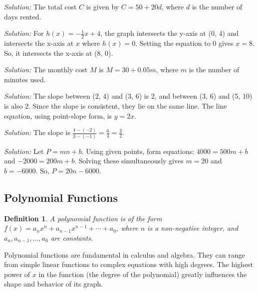 \documentclass[a4paper,12pt]{book}
\newenvironment{solution}[1][]
{\par\noindent\textit{Solution:} \rmfamily}{\medskip}
\newtheorem{definition}{Definition}
\begin{document}
\begin{solution}[5]
The total cost \( C \) is given by \( C = 50 + 20d \), where \( d \) is the number of days rented.
\end{solution}

\begin{solution}[6]
For \( h(x) = -\frac{1}{2}x + 4 \), the graph intersects the y-axis at (0, 4) and intersects the x-axis at \( x \) where \( h(x) = 0 \). Setting the equation to 0 gives \( x = 8 \). So, it intersects the x-axis at (8, 0).
\end{solution}

\begin{solution}[7]
The monthly cost \( M \) is \( M = 30 + 0.05m \), where \( m \) is the number of minutes used.
\end{solution}

\begin{solution}[8]
The slope between (2, 4) and (3, 6) is 2, and between (3, 6) and (5, 10) is also 2. Since the slope is consistent, they lie on the same line. The line equation, using point-slope form, is \( y = 2x \).
\end{solution}

\begin{solution}[9]
The slope is \( \frac{4 - (-2)}{3 - (-1)} = \frac{6}{4} = \frac{3}{2} \).
\end{solution}

\begin{solution}[10]
Let \( P = mn + b \). Using given points, form equations: \( 4000 = 500m + b \) and \( -2000 = 200m + b \). Solving these simultaneously gives \( m = 20 \) and \( b = -6000 \). So, \( P = 20n - 6000 \).
\end{solution}


\subsection{Polynomial Functions}
\begin{definition}
A polynomial function is of the form \( f(x) = a_nx^n + a_{n-1}x^{n-1} + \cdots + a_0 \), where \( n \) is a non-negative integer, and \( a_n, a_{n-1}, \ldots, a_0 \) are constants.
\end{definition}

Polynomial functions are fundamental in calculus and algebra. They can range from simple linear functions to complex equations with high degrees. The highest power of \( x \) in the function (the degree of the polynomial) greatly influences the shape and behavior of its graph.
\end{document}
